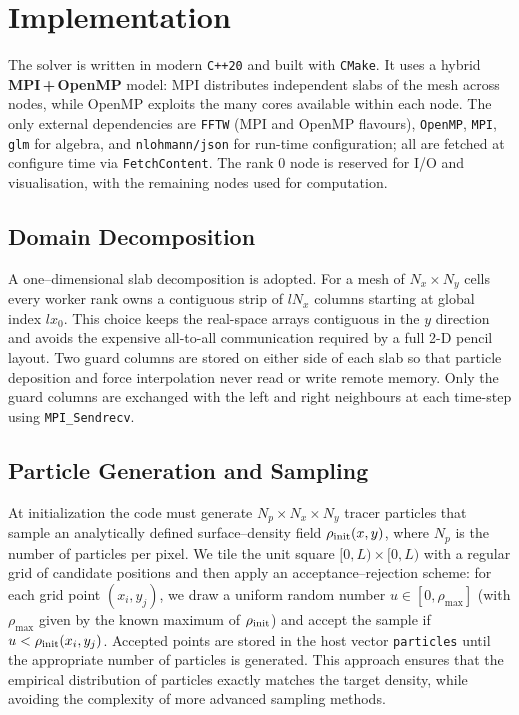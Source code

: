 \documentclass{lkx_paper}
\begin{document}
\section{Implementation}
\label{sec:implementation}

The solver is written in modern \texttt{C++20} and built with \texttt{CMake}.
It uses a hybrid \textbf{MPI\,+\,OpenMP} model:
MPI distributes independent slabs of the mesh across
nodes, while OpenMP exploits the many cores available
within each node.
The only external dependencies are
\texttt{FFTW} (MPI and OpenMP flavours), \texttt{OpenMP},
\texttt{MPI}, \texttt{glm} for algebra, and \texttt{nlohmann/json} for run-time
configuration; all are fetched at configure time via
\texttt{FetchContent}.
The rank 0 node is reserved for I/O and visualisation, with the remaining nodes used for computation.

\subsection{Domain Decomposition}
\label{subsec:domain}

A one–dimensional slab decomposition is adopted.
For a mesh of \(N_x\times N_y\) cells every worker rank
owns a contiguous strip of \(lN_x\) columns starting at
global index \(l x_0\).
This choice keeps the real-space arrays
contiguous in the \(y\) direction and avoids the expensive
all-to-all communication required by a full 2-D pencil
layout.
Two guard columns are stored on either side of each slab so that particle deposition and force interpolation never read or write remote memory.
Only the guard columns are exchanged with the left and
right neighbours at each time-step using \texttt{MPI\_Sendrecv}.

\subsection{Particle Generation and Sampling}
\label{subsec:particles}

At initialization the code must generate \(N_{p}\times N_x \times N_y\) tracer particles
that sample an analytically defined surface–density field
\(\rho_{\rm init}(x,y)\), where $N_{p}$ is the number of particles per pixel.
We tile the unit square \([0,L)\times[0,L)\) with a regular grid
of candidate positions and then apply an acceptance–rejection
scheme: for each grid point \((x_i,y_j)\), we draw a uniform
random number \(u\in[0,\rho_{\max}]\) (with \(\rho_{\max}\)
given by the known maximum of \(\rho_{\rm init}\)) and accept
the sample if \(u<\rho_{\rm init}(x_i,y_j)\).
Accepted points are stored in the host vector \texttt{particles}
until the appropriate number of particles is generated.
This approach ensures that the empirical distribution of
particles exactly matches the target density, while avoiding
the complexity of more advanced sampling methods.
\end{document}
